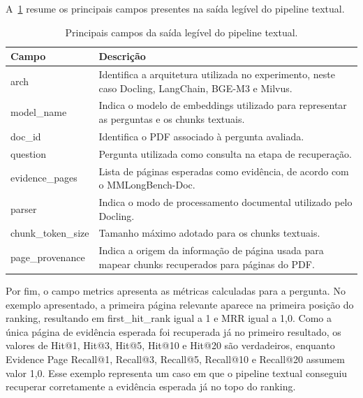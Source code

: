 A~\ref{tab:saida-textual-readable} resume os principais campos presentes na saída legível do pipeline textual.

\begin{table}[htbp]
\centering
\caption{Principais campos da saída legível do pipeline textual.}
\label{tab:saida-textual-readable}
\small
\renewcommand{\arraystretch}{1.2}
\begin{tabular}{|p{4.2cm}|p{9.0cm}|}
\hline
\textbf{Campo} & \textbf{Descrição} \\
\hline
arch & Identifica a arquitetura utilizada no experimento, neste caso Docling, LangChain, BGE-M3 e Milvus. \\
\hline
model\_name & Indica o modelo de embeddings utilizado para representar as perguntas e os chunks textuais. \\
\hline
doc\_id & Identifica o PDF associado à pergunta avaliada. \\
\hline
question & Pergunta utilizada como consulta na etapa de recuperação. \\
\hline
evidence\_pages & Lista de páginas esperadas como evidência, de acordo com o MMLongBench-Doc. \\
\hline
parser & Indica o modo de processamento documental utilizado pelo Docling. \\
\hline
chunk\_token\_size & Tamanho máximo adotado para os chunks textuais. \\
\hline
page\_provenance & Indica a origem da informação de página usada para mapear chunks recuperados para páginas do PDF. \\
\hline
\end{tabular}
\end{table}


Por fim, o campo metrics apresenta as métricas calculadas para a pergunta. No exemplo apresentado, a primeira página relevante aparece na primeira posição do ranking, resultando em first\_hit\_rank igual a 1 e MRR igual a 1,0. Como a única página de evidência esperada foi recuperada já no primeiro resultado, os valores de Hit@1, Hit@3, Hit@5, Hit@10 e Hit@20 são verdadeiros, enquanto Evidence Page Recall@1, Recall@3, Recall@5, Recall@10 e Recall@20 assumem valor 1,0. Esse exemplo representa um caso em que o pipeline textual conseguiu recuperar corretamente a evidência esperada já no topo do ranking.


